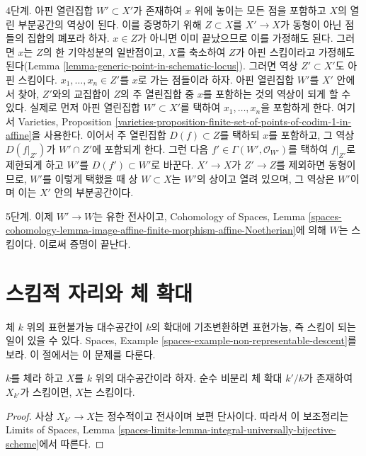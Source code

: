 \begin{remark}
\medskip\noindent
4단계. 아핀 열린집합 $W' \subset X'$가 존재하여 $x$ 위에 놓이는 모든
점을 포함하고 $X$의 열린 부분공간의 역상이 된다. 이를 증명하기 위해
$Z \subset X$를 $X' \to X$가 동형이 아닌 점들의 집합의 폐포라 하자.
$x \in Z$가 아니면 이미 끝났으므로 이를 가정해도 된다. 그러면 $x$는
$Z$의 한 기약성분의 일반점이고, $X$를 축소하여 $Z$가 아핀 스킴이라고
가정해도 된다(Lemma \ref{lemma-generic-point-in-schematic-locus}). 그러면
역상 $Z' \subset X'$도 아핀 스킴이다. $x_1, \ldots, x_n \in Z'$를
$x$로 가는 점들이라 하자. 아핀 열린집합 $W'$를 $X'$ 안에서
찾아, $Z'$와의 교집합이 $Z$의 주 열린집합 중 $x$를 포함하는 것의 역상이
되게 할 수 있다. 실제로 먼저 아핀 열린집합 $W' \subset X'$를 택하여
$x_1, \ldots, x_n$을 포함하게 한다. 여기서 Varieties, Proposition
\ref{varieties-proposition-finite-set-of-points-of-codim-1-in-affine}을
사용한다. 이어서 주 열린집합 $D(f) \subset Z$를 택하되 $x$를 포함하고,
그 역상 $D(f|_{Z'})$가 $W' \cap Z'$에 포함되게 한다. 그런 다음
$f' \in \Gamma(W', \mathcal{O}_{W'})$를 택하여 $f|_{Z'}$로 제한되게 하고
$W'$를 $D(f') \subset W'$로 바꾼다. $X' \to X$가 $Z' \to Z$를
제외하면 동형이므로, $W'$를 이렇게 택했을 때 상 $W \subset X$는
$W'$의 상이고 열려 있으며,
그 역상은 $W'$이며 이는 $X'$ 안의 부분공간이다.

\medskip\noindent
5단계. 이제 $W' \to W$는 유한 전사이고, Cohomology of Spaces, Lemma
\ref{spaces-cohomology-lemma-image-affine-finite-morphism-affine-Noetherian}에
의해 $W$는 스킴이다. 이로써 증명이 끝난다.
\end{remark}





\section{스킴적 자리와 체 확대}
\label{section-schematic-and-field-extension}

\noindent
체 $k$ 위의 표현불가능 대수공간이 $k$의 확대에 기초변환하면 표현가능,
즉 스킴이 되는 일이 있을 수 있다. Spaces, Example
\ref{spaces-example-non-representable-descent}를 보라. 이 절에서는 이
문제를 다룬다.

\begin{lemma}
\label{lemma-scheme-after-purely-inseparable-base-change}
$k$를 체라 하고 $X$를 $k$ 위의 대수공간이라 하자. 순수 비분리 체 확대
$k'/k$가 존재하여 $X_{k'}$가 스킴이면, $X$는 스킴이다.
\end{lemma}

\begin{proof}
사상 $X_{k'} \to X$는 정수적이고 전사이며 보편 단사이다. 따라서 이
보조정리는 Limits of Spaces, Lemma
\ref{spaces-limits-lemma-integral-universally-bijective-scheme}에서 따른다.
\end{proof}

